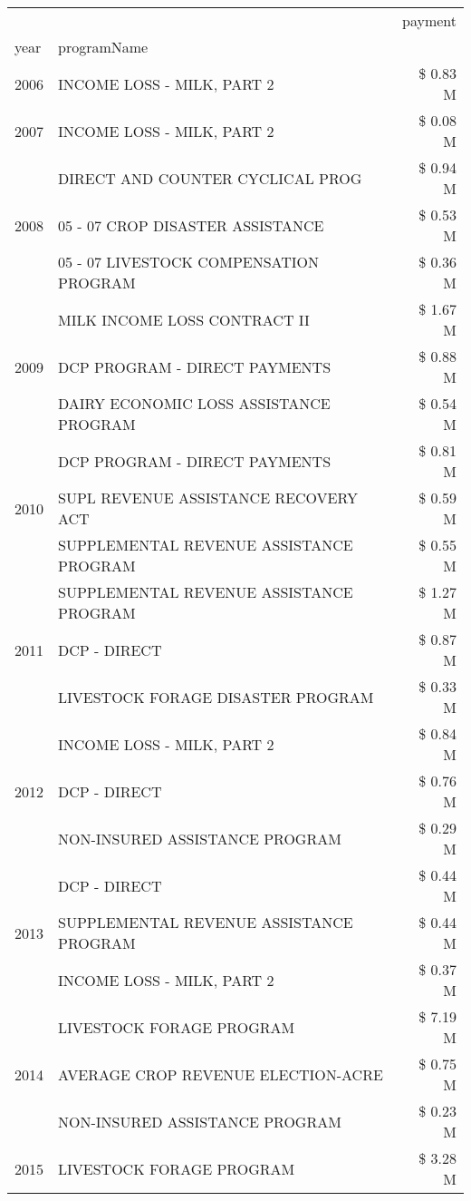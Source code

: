 \begin{tabular}{llr}
\toprule
 &  & payment \\
year & programName &  \\
\midrule
2006 & INCOME LOSS - MILK, PART 2 & \$ 0.83 M \\
\cline{1-3}
2007 & INCOME LOSS - MILK, PART 2 & \$ 0.08 M \\
\cline{1-3}
\multirow[t]{3}{*}{2008} & DIRECT AND COUNTER CYCLICAL PROG & \$ 0.94 M \\
 & 05 - 07 CROP DISASTER ASSISTANCE & \$ 0.53 M \\
 & 05 - 07 LIVESTOCK COMPENSATION PROGRAM & \$ 0.36 M \\
\cline{1-3}
\multirow[t]{3}{*}{2009} & MILK INCOME LOSS CONTRACT II & \$ 1.67 M \\
 & DCP PROGRAM - DIRECT PAYMENTS & \$ 0.88 M \\
 & DAIRY ECONOMIC LOSS ASSISTANCE PROGRAM & \$ 0.54 M \\
\cline{1-3}
\multirow[t]{3}{*}{2010} & DCP PROGRAM - DIRECT PAYMENTS & \$ 0.81 M \\
 & SUPL REVENUE ASSISTANCE RECOVERY ACT & \$ 0.59 M \\
 & SUPPLEMENTAL REVENUE ASSISTANCE PROGRAM & \$ 0.55 M \\
\cline{1-3}
\multirow[t]{3}{*}{2011} & SUPPLEMENTAL REVENUE ASSISTANCE PROGRAM & \$ 1.27 M \\
 & DCP - DIRECT & \$ 0.87 M \\
 & LIVESTOCK FORAGE DISASTER PROGRAM & \$ 0.33 M \\
\cline{1-3}
\multirow[t]{3}{*}{2012} & INCOME LOSS - MILK, PART 2 & \$ 0.84 M \\
 & DCP - DIRECT & \$ 0.76 M \\
 & NON-INSURED ASSISTANCE PROGRAM & \$ 0.29 M \\
\cline{1-3}
\multirow[t]{3}{*}{2013} & DCP - DIRECT & \$ 0.44 M \\
 & SUPPLEMENTAL REVENUE ASSISTANCE PROGRAM & \$ 0.44 M \\
 & INCOME LOSS - MILK, PART 2 & \$ 0.37 M \\
\cline{1-3}
\multirow[t]{3}{*}{2014} & LIVESTOCK FORAGE PROGRAM & \$ 7.19 M \\
 & AVERAGE CROP REVENUE ELECTION-ACRE & \$ 0.75 M \\
 & NON-INSURED ASSISTANCE PROGRAM & \$ 0.23 M \\
\cline{1-3}
\multirow[t]{3}{*}{2015} & LIVESTOCK FORAGE PROGRAM & \$ 3.28 M \\

\end{tabular}
